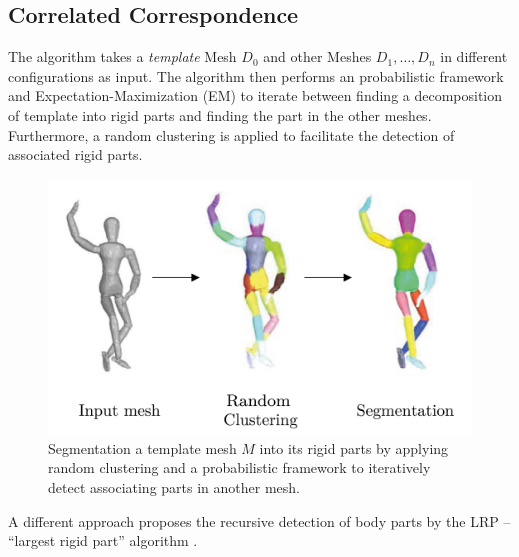 \documentclass[notitlepage,english]{hgbreport}
\begin{document}
	\subsection{Correlated Correspondence}
	The algorithm takes a \textit{template} Mesh $D_0$ and other Meshes $D_1,\ldots,D_n$ in different configurations as input. The algorithm then performs an probabilistic framework and Expectation-Maximization (EM) to iterate between finding a decomposition of template into rigid parts and finding the part in the other meshes. Furthermore, a random clustering is applied to facilitate the detection of associated rigid parts.
	\begin{figure}
		\centering
		\includegraphics[width=0.7\linewidth]{anguelov}
		\caption{Segmentation a template mesh $M$ into its rigid parts by applying random clustering and a probabilistic framework to iteratively detect associating parts in another mesh.}
		\label{fig:correlatedcorrespondance}
	\end{figure}
	 A different approach proposes the recursive detection of body parts by the LRP -- ``largest rigid part'' algorithm \cite {guo2016correspondence}. 
\end{document}

